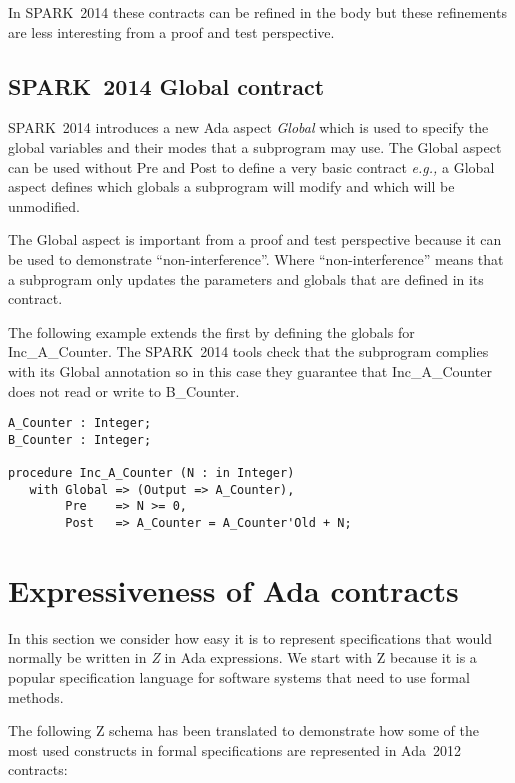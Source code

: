 \documentclass{llncs}
\newcommand{\newspark}{SPARK~2014\xspace}
\newcommand{\ada}{Ada\xspace}
\newcommand{\adatwtw}{Ada~2012\xspace}
\newcommand{\eg}{\textit{e.g.,}\xspace}
\begin{document}
In \newspark these contracts can be refined in the body but these
refinements are less interesting from a proof and test perspective.

\subsection{\newspark Global contract}

\newspark introduces a new \ada aspect \emph{Global} which is used to
specify the global variables and their modes that a subprogram may
use. The Global aspect can be used without Pre and Post to define a
very basic contract \eg a Global aspect defines which globals a
subprogram will modify and which will be unmodified.

The Global aspect is important from a proof and test perspective
because it can be used to demonstrate ``non-interference''. Where
``non-interference'' means that a subprogram only updates the
parameters and globals that are defined in its contract.

The following example extends the first by defining the globals for
Inc\_A\_Counter. The \newspark tools check that the subprogram
complies with its Global annotation so in this case they guarantee
that Inc\_A\_Counter does not read or write to B\_Counter.

\begin{lstlisting}[language=SPARK]
A_Counter : Integer;
B_Counter : Integer;

procedure Inc_A_Counter (N : in Integer)
   with Global => (Output => A_Counter),
        Pre    => N >= 0,
        Post   => A_Counter = A_Counter'Old + N;
\end{lstlisting}


\section{Expressiveness of Ada contracts}

In this section we consider how easy it is to represent specifications
that would normally be written in \emph{Z} in Ada expressions. We
start with Z because it is a popular specification language for
software systems that need to use formal methods.

The following Z schema has been translated to demonstrate how some of
the most used constructs in formal specifications are represented in
\adatwtw contracts:
\end{document}
